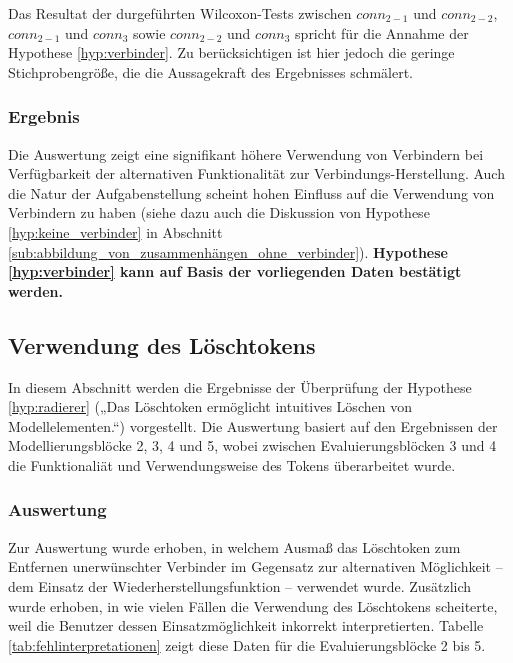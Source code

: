 Das Resultat der durgeführten Wilcoxon-Tests zwischen $conn_{2-1}$ und $conn_{2-2}$, $conn_{2-1}$ und $conn_{3}$ sowie $conn_{2-2}$ und $conn_{3}$ spricht für die Annahme der Hypothese \ref{hyp:verbinder}. Zu berücksichtigen ist hier jedoch die geringe Stichprobengröße, die die Aussagekraft des Ergebnisses schmälert.

\subsubsection{Ergebnis} %

Die Auswertung zeigt eine signifikant höhere Verwendung von Verbindern bei Verfügbarkeit der alternativen Funktionalität zur Verbindungs-Herstellung. Auch die Natur der Aufgabenstellung scheint hohen Einfluss auf die Verwendung von Verbindern zu haben (siehe dazu auch die Diskussion von Hypothese \ref{hyp:keine_verbinder} in Abschnitt \ref{sub:abbildung_von_zusammenhängen_ohne_verbinder}). \textbf{Hypothese \ref{hyp:verbinder} kann auf Basis der vorliegenden Daten bestätigt werden.}


\subsection{Verwendung des Löschtokens} %
\label{sub:verwendung_des_löschtokens}

In diesem Abschnitt werden die Ergebnisse der Überprüfung der Hypothese \ref{hyp:radierer} („Das Löschtoken ermöglicht intuitives Löschen von Modellelementen.“) vorgestellt. Die Auswertung basiert auf den Ergebnissen der Modellierungsblöcke 2, 3, 4 und 5, wobei zwischen Evaluierungsblöcken 3 und 4 die Funktionaliät und Verwendungsweise des Tokens überarbeitet wurde.

\subsubsection{Auswertung} %

Zur Auswertung wurde erhoben, in welchem Ausmaß das Löschtoken zum Entfernen unerwünschter Verbinder im Gegensatz zur alternativen Möglichkeit -- dem Einsatz der Wiederherstellungsfunktion -- verwendet wurde. Zusätzlich wurde erhoben, in wie vielen Fällen die Verwendung des Löschtokens scheiterte, weil die Benutzer dessen Einsatzmöglichkeit inkorrekt interpretierten. Tabelle \ref{tab:fehlinterpretationen} zeigt diese Daten für die Evaluierungsblöcke 2 bis 5.

